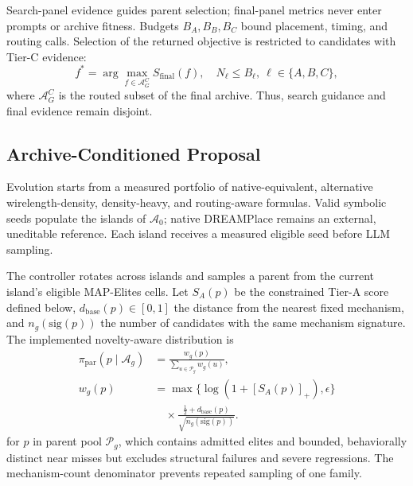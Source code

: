 Search-panel evidence guides parent selection; final-panel metrics never enter
prompts or archive fitness. Budgets $B_A,B_B,B_C$ bound placement, timing, and
routing calls. Selection of the returned objective is restricted to candidates
with Tier-C evidence:
\begin{equation}
f^*=\arg\max_{f\in\mathcal{A}^{C}_G}S_{\mathrm{final}}(f),
\quad N_\ell\leq B_\ell,\ \ell\in\{A,B,C\},
\label{eq:routed-objective}
\end{equation}
where $\mathcal{A}^{C}_G$ is the routed subset of the final archive. Thus,
search guidance and final evidence remain disjoint.

\subsection{Archive-Conditioned Proposal}
\label{sec:proposer}

Evolution starts from a measured portfolio of native-equivalent, alternative
wirelength-density, density-heavy, and routing-aware formulas. Valid symbolic
seeds populate the islands of $\mathcal{A}_0$; native DREAMPlace remains an
external, uneditable reference. Each island receives a measured eligible seed
before LLM sampling.

The controller rotates across islands and samples a parent from the current
island's eligible MAP-Elites cells. Let $S_A(p)$ be the constrained Tier-A
score defined below, $d_{\mathrm{base}}(p)\in[0,1]$ the distance from the
nearest fixed mechanism, and $n_g(\mathrm{sig}(p))$ the number of candidates
with the same mechanism signature. The implemented novelty-aware distribution
is
\begin{equation}
\begin{aligned}
\pi_{\mathrm{par}}(p\mid\mathcal{A}_g)
&=\frac{w_g(p)}{\sum_{u\in\mathcal{P}_g}w_g(u)},\\
w_g(p)&=\max\{\log(1+[S_A(p)]_+),\epsilon\}\\
&\quad\times\frac{\tfrac12+d_{\mathrm{base}}(p)}
{\sqrt{n_g(\mathrm{sig}(p))}}.
\end{aligned}
\label{eq:parent-policy}
\end{equation}
for $p$ in parent pool $\mathcal{P}_g$, which contains admitted elites and
bounded, behaviorally distinct near misses but excludes structural failures
and severe regressions. The mechanism-count denominator prevents repeated
sampling of one family.

